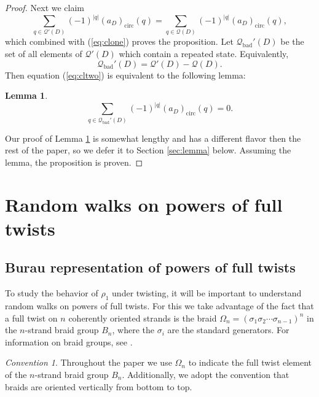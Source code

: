 \documentclass[11pt,hyp,]{nyjm}
\numberwithin{thm}{section}
\newtheorem{lemma}[thm]{Lemma}
\theoremstyle{definition}
\theoremstyle{remark}
\newtheorem{conv}[thm]{Convention}
\begin{document}
\begin{proof}
		Next we claim
		\begin{equation}
			\label{eq:cltwo}
			\sum_{q \in \mathcal{Q}'(D)} (-1)^{|q|}(a_D)_\text{circ}(q) = \sum_{q \in \mathcal{Q}(D)} (-1)^{|q|}(a_D)_\text{circ}(q),
		\end{equation}
		which combined with (\ref{eq:clone}) proves the proposition. Let $\mathcal{Q}_\text{bad}'(D)$ be the set of all elements of $\mathcal{Q}'(D)$ which contain a repeated state. Equivalently,
		$$
		\mathcal{Q}_\text{bad}'(D) = \mathcal{Q}'(D) - \mathcal{Q}(D).
		$$
		Then equation (\ref{eq:cltwo}) is equivalent to the following lemma:
		\begin{lemma} 
			\label{lem:deferred}
			$$
				\sum_{q \in \mathcal{Q}_\text{bad}'(D)} (-1)^{|q|}(a_D)_\text{circ}(q) = 0.
			$$
		\end{lemma}
		Our proof of Lemma \ref{lem:deferred} is somewhat lengthy and has a different flavor then the rest of the paper, so we defer it to Section \ref{sec:lemma} below. Assuming the lemma, the proposition is proven.
	\end{proof}
	
	\section{Random walks on powers of full twists}
	\label{sec:burau}
	
	\subsection{Burau representation of powers of full twists}
	
	To study the behavior of $\rho_1$ under twisting, it will be important to understand random walks on powers of full twists. For this we take advantage of the fact that a full twist on $n$ coherently oriented strands is the braid $\Omega_n = (\sigma_1\sigma_2 \cdots \sigma_{n - 1})^n$ in the $n$-strand braid group $B_n$, where the $\sigma_i$ are the standard generators. For information on braid groups, see \cite{katu08}.
	
	\begin{conv}
		Throughout the paper we use $\Omega_n$ to indicate the full twist element of the $n$-strand braid group $B_n$. Additionally, we adopt the convention that braids are oriented vertically from bottom to top.
	\end{conv}
	
\end{document}
